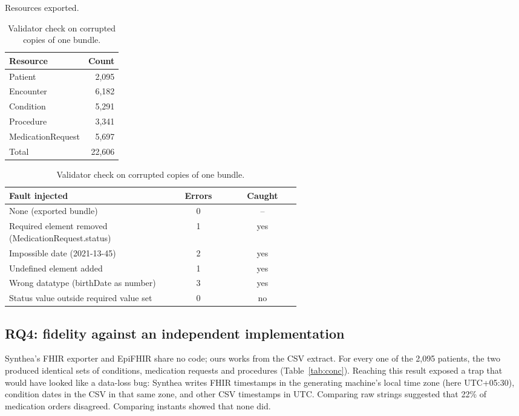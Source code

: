 \documentclass[preprint,12pt]{elsarticle}
\begin{document}
\begin{table}[t]
\centering
\begin{minipage}[t]{0.38\linewidth}
\centering
\caption{Resources exported.}
\label{tab:fhir}
\footnotesize
\begin{tabular}{@{}lr@{}}
\toprule
Resource & Count \\
\midrule
Patient & 2,095 \\
Encounter & 6,182 \\
Condition & 5,291 \\
Procedure & 3,341 \\
MedicationRequest & 5,697 \\
\midrule Total & 22,606 \\
\bottomrule
\end{tabular}
\end{minipage}\hfill
\begin{minipage}[t]{0.58\linewidth}
\centering
\caption{Validator check on corrupted copies of one bundle.}
\label{tab:sanity}
\footnotesize
\begin{tabular}{@{}p{0.56\linewidth}cc@{}}
\toprule
Fault injected & Errors & Caught \\
\midrule
None (exported bundle) & 0 & -- \\
Required element removed (MedicationRequest.status) & 1 & yes \\
Impossible date (2021-13-45) & 2 & yes \\
Undefined element added & 1 & yes \\
Wrong datatype (birthDate as number) & 3 & yes \\
Status value outside required value set & 0 & no \\
\bottomrule
\end{tabular}
\end{minipage}
\end{table}

\subsection{RQ4: fidelity against an independent implementation}
Synthea's FHIR exporter and EpiFHIR share no code; ours works from the CSV extract. For every one of the 2,095 patients, the two produced identical sets of conditions, medication requests and procedures (Table~\ref{tab:conc}). Reaching this result exposed a trap that would have looked like a data-loss bug: Synthea writes FHIR timestamps in the generating machine's local time zone (here UTC+05:30), condition dates in the CSV in that same zone, and other CSV timestamps in UTC. Comparing raw strings suggested that 22\% of medication orders disagreed. Comparing instants showed that none did.
\end{document}
